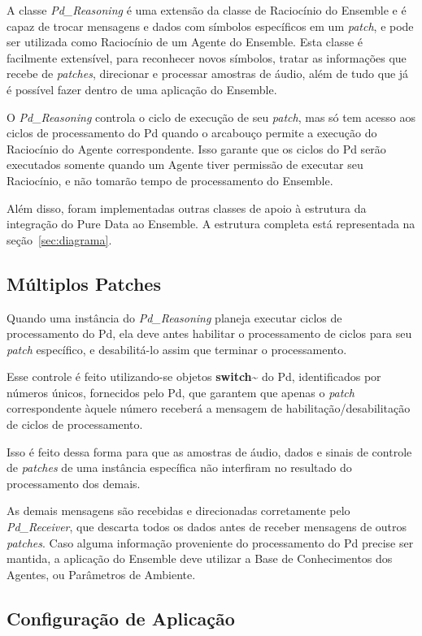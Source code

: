 \documentclass[a4paper, 11pt, twoside]{article}
\begin{document}
\begin{multicols}{2}
A classe \textit{Pd\_Reasoning} é uma extensão da classe de Raciocínio
do Ensemble e é capaz de trocar mensagens e dados com símbolos específicos 
em um \textit{patch}, e pode ser utilizada como Raciocínio de um Agente do
Ensemble. Esta classe é facilmente extensível, para reconhecer novos símbolos,
tratar as informações que recebe de \textit{patches}, direcionar e processar
amostras de áudio, além de tudo que já é possível fazer dentro de uma aplicação do 
Ensemble.

O \textit{Pd\_Reasoning} controla o ciclo de execução de seu \textit{patch},
mas só tem acesso aos ciclos de processamento do Pd quando o arcabouço
permite a execução do Raciocínio do Agente correspondente. Isso garante
que os ciclos do Pd serão executados somente quando um Agente tiver
permissão de executar seu Raciocínio, e não tomarão tempo de processamento
do Ensemble.

Além disso, foram implementadas outras classes de apoio à estrutura da
integração do Pure Data ao Ensemble. A estrutura completa está representada
na seção~\ref{sec:diagrama}.

\subsection{Múltiplos Patches}

Quando uma instância do \textit{Pd\_Reasoning} planeja executar ciclos de 
processamento do Pd, ela deve antes habilitar o processamento de ciclos 
para seu \textit{patch} específico, e desabilitá-lo assim que terminar o 
processamento.

Esse controle é feito utilizando-se objetos \textbf{switch\~} do Pd,
identificados por números únicos, fornecidos pelo Pd, que garantem
que apenas o \textit{patch} correspondente àquele número receberá a
mensagem de habilitação/desabilitação de ciclos de processamento.

Isso é feito dessa forma para que as amostras de áudio, dados e sinais de 
controle de \textit{patches} de uma instância específica não interfiram no
resultado do processamento dos demais.

As demais mensagens são recebidas e direcionadas corretamente pelo 
\textit{Pd\_Receiver}, que descarta todos os dados antes de receber 
mensagens de outros \textit{patches}. Caso alguma informação proveniente
do processamento do Pd precise ser mantida, a aplicação do Ensemble deve
utilizar a Base de Conhecimentos dos Agentes, ou Parâmetros de Ambiente.

\subsection{Configuração de Aplicação}


\end{multicols}
\end{document}
